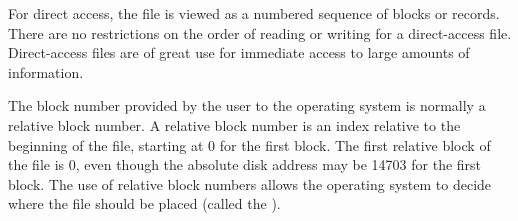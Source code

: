For direct access, the file is viewed as a numbered sequence of blocks or records.
There are no restrictions on the order of reading or writing for a direct-access file.
Direct-access files are of great use for immediate access to large amounts of information.

The block number provided by the user to the operating system is normally a relative block number.
A relative block number is an index relative to the beginning of the file, starting at 0 for the first block.
The first relative block of the file is 0, even though the absolute disk address may be 14703 for the first block.
The use of relative block numbers allows the operating system to decide where the file should be placed (called the ).

